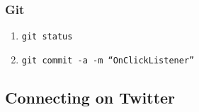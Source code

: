 \begin{frame}[fragile]
\frametitle{Git}
\begin{enumerate}
\item \texttt{git status}
\item \texttt{git commit -a -m ``OnClickListener''}

\end{enumerate}


\end{frame}
\subsection{Connecting on Twitter}

